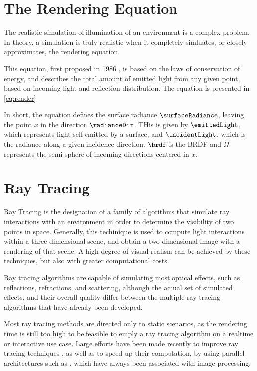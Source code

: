 \documentclass[main.tex]{subfiles}
\begin{document}
\section{The Rendering Equation}

The realistic simulation of illumination of an environment is a complex problem. In theory, a simulation is truly realistic when it completely simluates, or closely approximates, the rendering equation.

This equation, first proposed in 1986 \cite{kajiya1986rendering}, is based on the laws of conservation of energy, and describes the total amount of emitted light from any given point, based on incoming light and reflection distribution. The equation is presented in \cref{eq:render}


In short, the equation defines the surface radiance $\surfaceRadiance$, leaving the point $x$ in the direction $\radianceDir$. THis is given by $\emittedLight$, which represents light self-emitted by a surface, and $\incidentLight$, which is the radiance along a given incidence direction. $\brdf$ is the \acf{BRDF} and $\Omega$ represents the semi-sphere of incoming directions centered in $x$.


\section{Ray Tracing} \label{section:ray_tracing}

Ray Tracing is the designation of a family of algorithms that simulate ray interactions with an environment in order to determine the visibility of two points in space.
Generally, this techinique is used to compute light interactions within a three-dimensional scene, and obtain a two-dimensional image with a rendering of that scene. A high degree of visual realism can be achieved by these techniques, but also with greater computational costs.

Ray tracing algorithms are capable of simulating most optical effects, such as reflections, refractions, and scattering, although the actual set of simulated effects, and their overall quality differ between the multiple ray tracing algorithms that have already been developed.

Most ray tracing methods are directed only to static scenarios, as the rendering time is still too high to be feasible to emply a ray tracing algorithm on a realtime or interactive use case.
Large efforts have been made recently to improve ray tracing techniques , as well as to speed up their computation, by using parallel architectures such as \gpus, which have always been associated with image processing.
\end{document}
